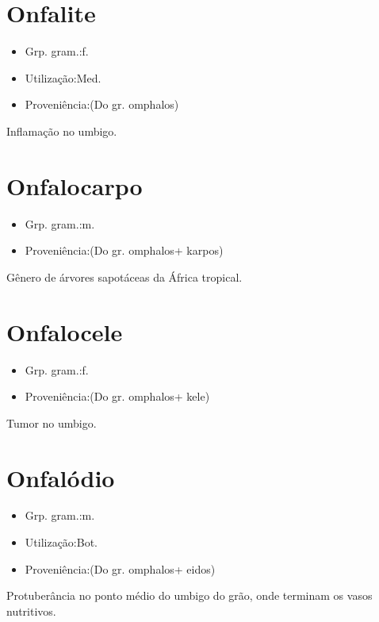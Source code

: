 \section{Onfalite}
\begin{itemize}
\item {Grp. gram.:f.}
\end{itemize}
\begin{itemize}
\item {Utilização:Med.}
\end{itemize}
\begin{itemize}
\item {Proveniência:(Do gr. \textunderscore omphalos\textunderscore )}
\end{itemize}
Inflamação no umbigo.
\section{Onfalocarpo}
\begin{itemize}
\item {Grp. gram.:m.}
\end{itemize}
\begin{itemize}
\item {Proveniência:(Do gr. \textunderscore omphalos\textunderscore  + \textunderscore karpos\textunderscore )}
\end{itemize}
Gênero de árvores sapotáceas da África tropical.
\section{Onfalocele}
\begin{itemize}
\item {Grp. gram.:f.}
\end{itemize}
\begin{itemize}
\item {Proveniência:(Do gr. \textunderscore omphalos\textunderscore  + \textunderscore kele\textunderscore )}
\end{itemize}
Tumor no umbigo.
\section{Onfalódio}
\begin{itemize}
\item {Grp. gram.:m.}
\end{itemize}
\begin{itemize}
\item {Utilização:Bot.}
\end{itemize}
\begin{itemize}
\item {Proveniência:(Do gr. \textunderscore omphalos\textunderscore  + \textunderscore eidos\textunderscore )}
\end{itemize}
Protuberância no ponto médio do umbigo do grão, onde terminam os vasos nutritivos.

